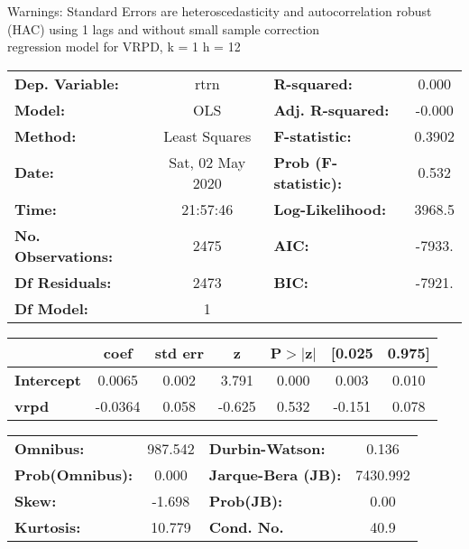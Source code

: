 Warnings: \newline
 [1] Standard Errors are heteroscedasticity and autocorrelation robust (HAC) using 1 lags and without small sample correction\\ 

regression model for VRPD, k = 1 h = 12\begin{center}
\begin{tabular}{lclc}
\toprule
\textbf{Dep. Variable:}    &       rtrn       & \textbf{  R-squared:         } &     0.000   \\
\textbf{Model:}            &       OLS        & \textbf{  Adj. R-squared:    } &    -0.000   \\
\textbf{Method:}           &  Least Squares   & \textbf{  F-statistic:       } &    0.3902   \\
\textbf{Date:}             & Sat, 02 May 2020 & \textbf{  Prob (F-statistic):} &    0.532    \\
\textbf{Time:}             &     21:57:46     & \textbf{  Log-Likelihood:    } &    3968.5   \\
\textbf{No. Observations:} &        2475      & \textbf{  AIC:               } &    -7933.   \\
\textbf{Df Residuals:}     &        2473      & \textbf{  BIC:               } &    -7921.   \\
\textbf{Df Model:}         &           1      & \textbf{                     } &             \\
\bottomrule
\end{tabular}
\begin{tabular}{lcccccc}
                   & \textbf{coef} & \textbf{std err} & \textbf{z} & \textbf{P$> |$z$|$} & \textbf{[0.025} & \textbf{0.975]}  \\
\midrule
\textbf{Intercept} &       0.0065  &        0.002     &     3.791  &         0.000        &        0.003    &        0.010     \\
\textbf{vrpd}      &      -0.0364  &        0.058     &    -0.625  &         0.532        &       -0.151    &        0.078     \\
\bottomrule
\end{tabular}
\begin{tabular}{lclc}
\textbf{Omnibus:}       & 987.542 & \textbf{  Durbin-Watson:     } &    0.136  \\
\textbf{Prob(Omnibus):} &   0.000 & \textbf{  Jarque-Bera (JB):  } & 7430.992  \\
\textbf{Skew:}          &  -1.698 & \textbf{  Prob(JB):          } &     0.00  \\
\textbf{Kurtosis:}      &  10.779 & \textbf{  Cond. No.          } &     40.9  \\
\bottomrule
\end{tabular}
\end{center}

